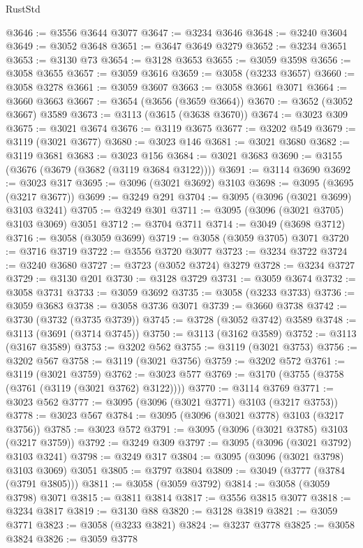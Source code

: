 \begin{lexlean}{RustStd}
\begin{coremodule}
@3646 := @3556 @3644 @3077
@3647 := @3234 @3646
@3648 := @3240 @3604
@3649 := @3052 @3648
@3651 := @3647 @3649 @3279
@3652 := @3234 @3651
@3653 := @3130 @73
@3654 := @3128 @3653
@3655 := @3059 @3598
@3656 := @3058 @3655
@3657 := @3059 @3616
@3659 := @3058 (@3233 @3657)
@3660 := @3058 @3278
@3661 := @3059 @3607
@3663 := @3058 @3661 @3071
@3664 := @3660 @3663
@3667 := @3654 (@3656 (@3659 @3664))
@3670 := @3652 (@3052 @3667) @3589
@3673 := @3113 (@3615 (@3638 @3670))
@3674 := @3023 @309
@3675 := @3021 @3674
@3676 := @3119 @3675
@3677 := @3202 @549
@3679 := @3119 (@3021 @3677)
@3680 := @3023 @146
@3681 := @3021 @3680
@3682 := @3119 @3681
@3683 := @3023 @156
@3684 := @3021 @3683
@3690 := @3155 (@3676 (@3679 (@3682 (@3119 @3684 @3122))))
@3691 := @3114 @3690
@3692 := @3023 @317
@3695 := @3096 (@3021 @3692) @3103
@3698 := @3095 (@3695 (@3217 @3677))
@3699 := @3249 @291
@3704 := @3095 (@3096 (@3021 @3699) @3103 @3241)
@3705 := @3249 @301
@3711 := @3095 (@3096 (@3021 @3705) @3103 @3069) @3051
@3712 := @3704 @3711
@3714 := @3049 (@3698 @3712)
@3716 := @3058 (@3059 @3699)
@3719 := @3058 (@3059 @3705) @3071
@3720 := @3716 @3719
@3722 := @3556 @3720 @3077
@3723 := @3234 @3722
@3724 := @3240 @3680
@3727 := @3723 (@3052 @3724) @3279
@3728 := @3234 @3727
@3729 := @3130 @201
@3730 := @3128 @3729
@3731 := @3059 @3674
@3732 := @3058 @3731
@3733 := @3059 @3692
@3735 := @3058 (@3233 @3733)
@3736 := @3059 @3683
@3738 := @3058 @3736 @3071
@3739 := @3660 @3738
@3742 := @3730 (@3732 (@3735 @3739))
@3745 := @3728 (@3052 @3742) @3589
@3748 := @3113 (@3691 (@3714 @3745))
@3750 := @3113 (@3162 @3589)
@3752 := @3113 (@3167 @3589)
@3753 := @3202 @562
@3755 := @3119 (@3021 @3753)
@3756 := @3202 @567
@3758 := @3119 (@3021 @3756)
@3759 := @3202 @572
@3761 := @3119 (@3021 @3759)
@3762 := @3023 @577
@3769 := @3170 (@3755 (@3758 (@3761 (@3119 (@3021 @3762) @3122))))
@3770 := @3114 @3769
@3771 := @3023 @562
@3777 := @3095 (@3096 (@3021 @3771) @3103 (@3217 @3753))
@3778 := @3023 @567
@3784 := @3095 (@3096 (@3021 @3778) @3103 (@3217 @3756))
@3785 := @3023 @572
@3791 := @3095 (@3096 (@3021 @3785) @3103 (@3217 @3759))
@3792 := @3249 @309
@3797 := @3095 (@3096 (@3021 @3792) @3103 @3241)
@3798 := @3249 @317
@3804 := @3095 (@3096 (@3021 @3798) @3103 @3069) @3051
@3805 := @3797 @3804
@3809 := @3049 (@3777 (@3784 (@3791 @3805)))
@3811 := @3058 (@3059 @3792)
@3814 := @3058 (@3059 @3798) @3071
@3815 := @3811 @3814
@3817 := @3556 @3815 @3077
@3818 := @3234 @3817
@3819 := @3130 @88
@3820 := @3128 @3819
@3821 := @3059 @3771
@3823 := @3058 (@3233 @3821)
@3824 := @3237 @3778
@3825 := @3058 @3824
@3826 := @3059 @3778

\end{coremodule}
\end{lexlean}
